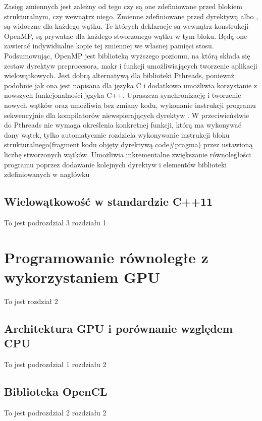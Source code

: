 \documentclass[document.tex]{subfiles}
\begin{document}
\indent Zasięg zmiennych jest zależny od tego czy są one zdefiniowane przed blokiem strukturalnym, czy wewnątrz niego. Zmienne zdefiniowane przed dyrektywą 
albo , są widoczne dla każdego wątku. Te których deklaracje są wewnątrz
konstrukcji OpenMP, są prywatne dla każdego stworzonego wątku w tym bloku.
Będą one zawierać indywidualne kopie tej zmiennej we własnej pamięci stosu.
\cite{openmp_pacheco}\cite{openmp_spec}
\\
\indent Podsumowując, OpenMP jest biblioteką wyższego poziomu, na którą składa się
zestaw dyrektyw preprocesora, makr i funkcji umożliwiających tworzenie aplikacji
wielowątkowych. Jest dobrą alternatywą dla biblioteki Pthreads, ponieważ podobnie jak
ona jest napisana dla języka C i dodatkowo umożliwia korzystanie z nowszych funkcjonalności
języka C++. Upraszcza synchronizację i tworzenie nowych wątków oraz umożliwia bez zmiany
kodu, wykonanie instrukcji programu sekwencyjnie dla kompilatorów niewspierających dyrektyw . W przeciwieństwie do Pthreads nie wymaga określenia konkretnej funkcji,
którą ma wykonywać dany wątek, tylko automatycznie rozdziela wykonywanie instrukcji bloku
strukturalnego(fragment kodu objęty dyrektywą code{\#pragma}) przez ustawioną liczbę stworzonych wątków. Umożliwia inkrementalne zwiększanie
równoległości programu poprzez dodawanie kolejnych dyrektyw i elementów biblioteki zdefiniowanych w nagłówku 



\subsection{Wielowątkowość w standardzie C++11}
To jest podrozdział 3 rozdziału 1




\section{Programowanie równoległe z wykorzystaniem GPU}
To jest rozdział 2

\subsection{Architektura GPU i porównanie względem CPU}
To jest podrozdział 1 rozdziału 2

\subsection{Biblioteka OpenCL}
To jest podrozdział 2 rozdziału 2

\end{document}
